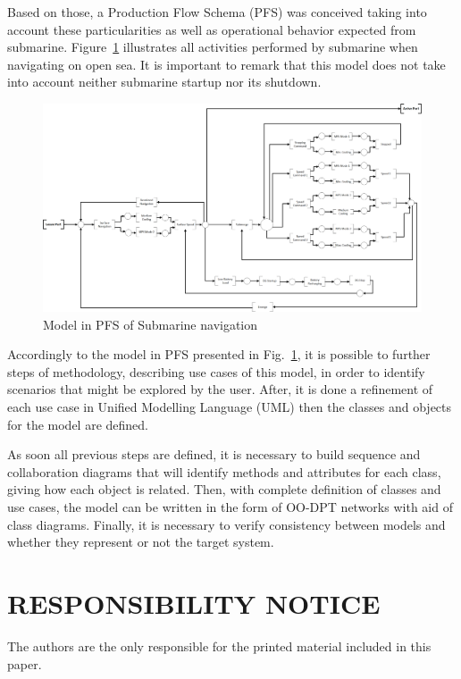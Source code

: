 \documentclass[10pt,fleqn,a4paper,twoside]{article}
\begin{document}
	Based on those, a Production Flow Schema (PFS) \citep{Miyagi1996} was conceived taking into account these particularities as well as operational behavior expected from submarine. Figure~\ref{fig:PFS} illustrates all activities performed by submarine when navigating on open sea. It is important to remark that this model does not take into account neither submarine  startup nor its shutdown.

	\begin{figure}[h!]
		\centering
		\includegraphics[angle=0, scale=0.300]{PFS-navegacao.png}
		\caption{Model in PFS of Submarine navigation}
		\label{fig:PFS}
	\end{figure}

	Accordingly to the model in PFS presented in Fig.~\ref{fig:PFS}, it is possible to further steps of methodology, describing use cases of this model, in order to identify scenarios that might be explored by the user. After, it is done a refinement of each use case in Unified Modelling Language (UML) then the classes and objects for the model are defined.

	As soon all previous steps are defined, it is necessary to build sequence and collaboration diagrams that will identify methods and attributes for each class, giving how each object is related. Then, with complete definition of classes and use cases, the model can be written in the form of OO-DPT networks with aid of class diagrams. Finally, it is necessary to verify consistency between models and whether they represent or not the target system.


	
	\renewcommand{\refname}{}
	

	\section{RESPONSIBILITY NOTICE}
	\label{sec:legal}

	The authors are the only responsible for the printed material included in this paper.
\end{document}
